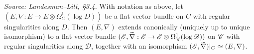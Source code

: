 \begin{lemma}
  \label{lem:iso-extension}
  \textit{Source: Landesman--Litt, \S3.4.}
  With notation as above, let $(E,\nabla: E \to E \otimes \Omega^1_C(\log D))$ be
  a flat vector bundle on $C$ with regular singularities along $D$. Then
  $(E,\nabla)$ extends canonically (uniquely up to unique isomorphism) to a flat
  vector bundle
  $(\mathscr{E}, \widetilde{\nabla}: \mathscr{E} \to \mathscr{E} \otimes \Omega^1_{\mathscr{C}}(\log \mathscr{D}))$
  on $\mathscr{C}$ with regular singularities along $\mathscr{D}$, together with an
  isomorphism $(\mathscr{E},\widetilde{\nabla})|_C \simeq (E,\nabla)$.
\end{lemma}
%
%
